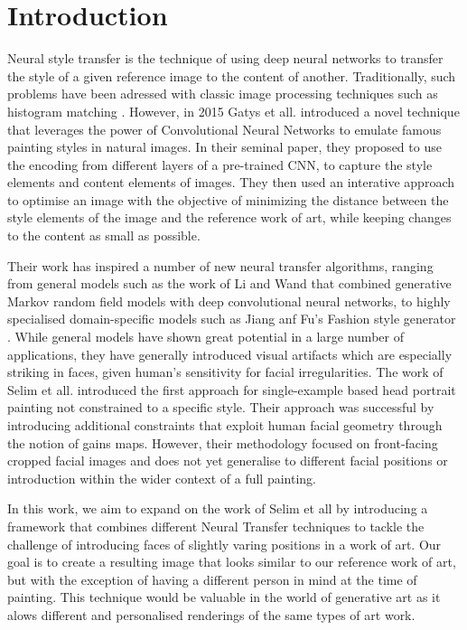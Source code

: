 \documentclass{article}
\begin{document}
\section{Introduction}  
Neural style transfer is the technique of using deep neural networks to transfer the style of a given reference image to the content of another. Traditionally, such problems have been adressed with classic image processing techniques such as histogram matching \cite{neumann2005color}. However, in 2015 Gatys et all. \cite{gatys2015neural} introduced a novel technique that leverages the power of Convolutional Neural Networks to emulate famous painting styles in natural images. In their seminal paper, they proposed to use the encoding from different layers of a pre-trained CNN, to capture the style elements and content elements of images. They then used an interative approach to optimise an image with the objective of minimizing the distance between the style elements of the image and the reference work of art, while keeping changes to the content as small as possible. 
\par
Their work has inspired a number of new neural transfer algorithms, ranging from general models such as the work of Li and Wand \cite{li2016combining} that combined generative Markov random field models with deep convolutional neural networks, to highly specialised domain-specific models such as Jiang anf Fu's Fashion style generator \cite{jiang2017fashion}. While general models have shown great potential in a large number of applications, they have generally introduced visual artifacts which are especially striking in faces, given human's sensitivity for facial irregularities. The work of Selim et all. \cite{selim2016painting} introduced the first approach for single-example based head portrait painting not constrained to a specific style. Their approach was successful by introducing additional constraints that exploit human facial geometry through the notion of gains maps. However, their methodology focused on front-facing cropped facial images and does not yet generalise to different facial positions or introduction within the wider context of a full painting. 
\par
In this work, we aim to expand on the work of Selim et all by introducing a framework that combines different Neural Transfer techniques to tackle the challenge of introducing faces of slightly varing positions in a work of art. Our goal is to create a resulting image that looks similar to our reference work of art, but with the exception of having a different person in mind at the time of painting. This technique would be valuable in the world of generative art as it alows different and personalised renderings of the same types of art work. 
\end{document}
